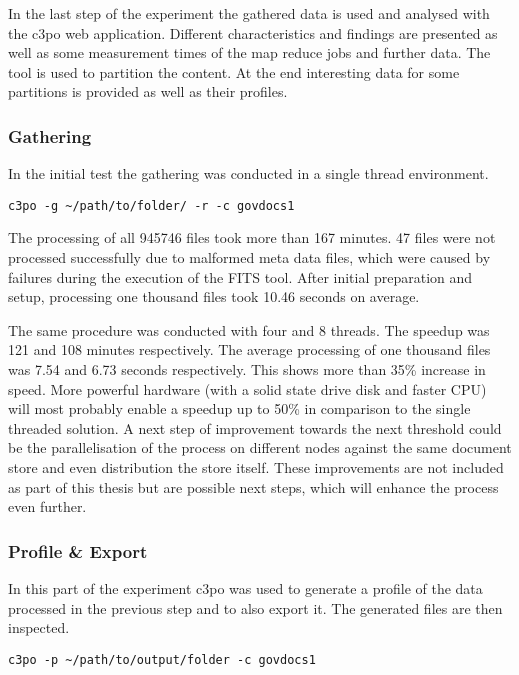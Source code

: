 In the last step of the experiment the gathered data is used and analysed with the c3po web application.
Different characteristics and findings are presented as well as some measurement times of the map reduce jobs and further data.
The tool is used to partition the content.
At the end interesting data for some partitions is provided as well as their profiles.

\subsubsection{Gathering}
In the initial test the gathering was conducted in a single thread environment. 

\begin{verbatim}
c3po -g ~/path/to/folder/ -r -c govdocs1
\end{verbatim}

The processing of all 945746 files took more than 167 minutes.
47 files were not processed successfully due to malformed meta data files, which were caused by failures during the execution of the FITS tool.
After initial preparation and setup, processing one thousand files took 10.46 seconds on average.

The same procedure was conducted with four and 8 threads.
The speedup was 121 and 108 minutes respectively.
The average processing of one thousand files was 7.54 and 6.73  seconds respectively.
This shows more than 35\% increase in speed.
More powerful hardware (with a solid state drive disk and faster CPU) will most probably enable a speedup up to 50\% in comparison to the single threaded solution.
A next step of improvement towards the next threshold could be the parallelisation of the process on different nodes against the same document store and even distribution the store itself.
These improvements are not included as part of this thesis but are possible next steps, which will enhance the process even further.

\subsubsection{Profile \& Export}
In this part of the experiment c3po was used to generate a profile of the data processed in the previous step and to also export it.
The generated files are then inspected.

\begin{verbatim}
c3po -p ~/path/to/output/folder -c govdocs1
\end{verbatim}

